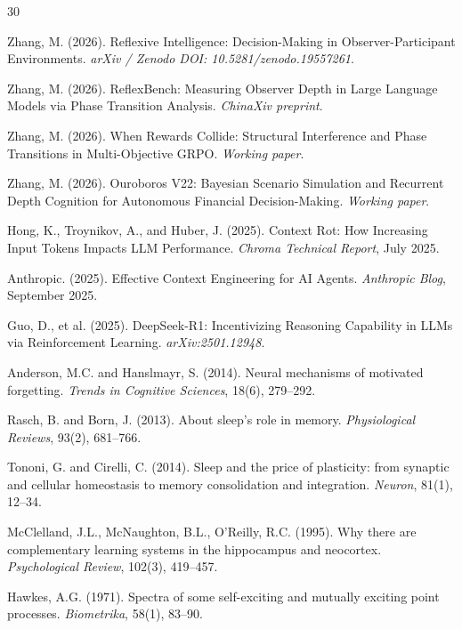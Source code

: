 \documentclass[11pt, a4paper]{article}
\begin{document}
\begin{thebibliography}{30}

Zhang, M. (2026).
Reflexive Intelligence: Decision-Making in Observer-Participant Environments.
\textit{arXiv / Zenodo DOI: 10.5281/zenodo.19557261}.

Zhang, M. (2026).
ReflexBench: Measuring Observer Depth in Large Language Models via Phase Transition Analysis.
\textit{ChinaXiv preprint}.

Zhang, M. (2026).
When Rewards Collide: Structural Interference and Phase Transitions in Multi-Objective GRPO.
\textit{Working paper}.

Zhang, M. (2026).
Ouroboros V22: Bayesian Scenario Simulation and Recurrent Depth Cognition for Autonomous Financial Decision-Making.
\textit{Working paper}.

Hong, K., Troynikov, A., and Huber, J. (2025).
Context Rot: How Increasing Input Tokens Impacts LLM Performance.
\textit{Chroma Technical Report}, July 2025.

Anthropic. (2025).
Effective Context Engineering for AI Agents.
\textit{Anthropic Blog}, September 2025.

Guo, D., et al. (2025).
DeepSeek-R1: Incentivizing Reasoning Capability in LLMs via Reinforcement Learning.
\textit{arXiv:2501.12948}.

Anderson, M.C. and Hanslmayr, S. (2014).
Neural mechanisms of motivated forgetting.
\textit{Trends in Cognitive Sciences}, 18(6), 279--292.

Rasch, B. and Born, J. (2013).
About sleep's role in memory.
\textit{Physiological Reviews}, 93(2), 681--766.

Tononi, G. and Cirelli, C. (2014).
Sleep and the price of plasticity: from synaptic and cellular homeostasis to memory consolidation and integration.
\textit{Neuron}, 81(1), 12--34.

McClelland, J.L., McNaughton, B.L., O'Reilly, R.C. (1995).
Why there are complementary learning systems in the hippocampus and neocortex.
\textit{Psychological Review}, 102(3), 419--457.

Hawkes, A.G. (1971).
Spectra of some self-exciting and mutually exciting point processes.
\textit{Biometrika}, 58(1), 83--90.


\end{thebibliography}
\end{document}
